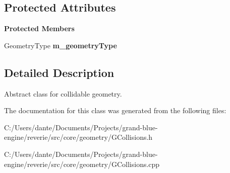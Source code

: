 \subsection*{Protected Attributes}
\begin{Indent}\textbf{ Protected Members}\par
\begin{DoxyCompactItemize}
\item 
\mbox{\label{classrev_1_1_colliding_geometry_a1d74cf624a358ceb5b3a3c8e70f13582}} 
Geometry\+Type {\bfseries m\+\_\+geometry\+Type}
\end{DoxyCompactItemize}
\end{Indent}


\subsection{Detailed Description}
Abstract class for collidable geometry. 

The documentation for this class was generated from the following files\+:\begin{DoxyCompactItemize}
\item 
C\+:/\+Users/dante/\+Documents/\+Projects/grand-\/blue-\/engine/reverie/src/core/geometry/G\+Collisions.\+h\item 
C\+:/\+Users/dante/\+Documents/\+Projects/grand-\/blue-\/engine/reverie/src/core/geometry/G\+Collisions.\+cpp\end{DoxyCompactItemize}
